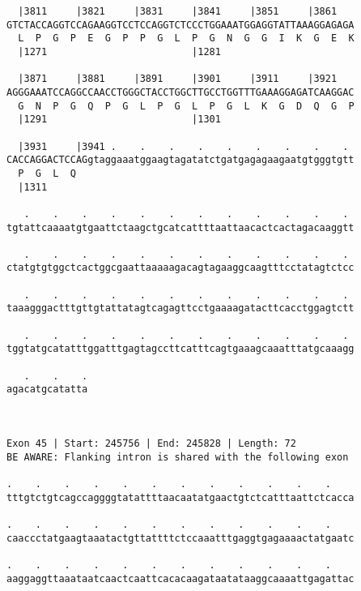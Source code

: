 \documentclass{article}
\begin{document}
\begin{Verbatim}
  |3811     |3821     |3831     |3841     |3851     |3861   
GTCTACCAGGTCCAGAAGGTCCTCCAGGTCTCCCTGGAAATGGAGGTATTAAAGGAGAGA
  L  P  G  P  E  G  P  P  G  L  P  G  N  G  G  I  K  G  E  K
  |1271                         |1281                       
  
  |3871     |3881     |3891     |3901     |3911     |3921   
AGGGAAATCCAGGCCAACCTGGGCTACCTGGCTTGCCTGGTTTGAAAGGAGATCAAGGAC
  G  N  P  G  Q  P  G  L  P  G  L  P  G  L  K  G  D  Q  G  P
  |1291                         |1301                       
  
  |3931     |3941 .    .    .    .    .    .    .    .    . 
CACCAGGACTCCAGgtaggaaatggaagtagatatctgatgagagaagaatgtgggtgtt
  P  G  L  Q                                                
  |1311                                                     
  
   .    .    .    .    .    .    .    .    .    .    .    . 
tgtattcaaaatgtgaattctaagctgcatcattttaattaacactcactagacaaggtt
                                                            
   .    .    .    .    .    .    .    .    .    .    .    . 
ctatgtgtggctcactggcgaattaaaaagacagtagaaggcaagtttcctatagtctcc
                                                            
   .    .    .    .    .    .    .    .    .    .    .    . 
taaagggactttgttgtattatagtcagagttcctgaaaagatacttcacctggagtctt
                                                            
   .    .    .    .    .    .    .    .    .    .    .    . 
tggtatgcatatttggatttgagtagccttcatttcagtgaaagcaaatttatgcaaagg
                                                            
   .    .    .
agacatgcatatta
              
              
 
Exon 45 | Start: 245756 | End: 245828 | Length: 72
BE AWARE: Flanking intron is shared with the following exon
 
.    .    .    .    .    .    .    .    .    .    .    .    
tttgtctgtcagccaggggtatattttaacaatatgaactgtctcatttaattctcacca
                                                            
.    .    .    .    .    .    .    .    .    .    .    .    
caaccctatgaagtaaatactgttattttctccaaatttgaggtgagaaaactatgaatc
                                                            
.    .    .    .    .    .    .    .    .    .    .    .    
aaggaggttaaataatcaactcaattcacacaagataatataaggcaaaattgagattac
                                                            

\end{Verbatim}
\end{document}
